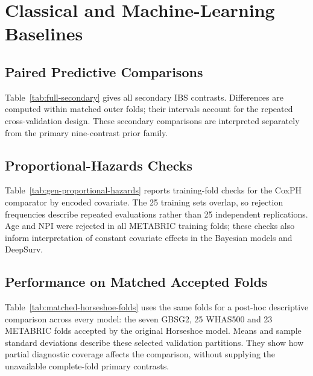 \chapter{Classical and Machine-Learning Baselines}\label{appendix-c-classical-and-machine-learning-baselines}\label{app:baselines}

\section{Paired Predictive Comparisons}
Table~\ref{tab:full-secondary} gives all secondary IBS contrasts. Differences are computed within matched outer folds; their intervals account for the repeated cross-validation design. These secondary comparisons are interpreted separately from the primary nine-contrast prior family.



\section{Proportional-Hazards Checks}
Table~\ref{tab:gen-proportional-hazards} reports training-fold checks for the CoxPH comparator by encoded covariate. The 25 training sets overlap, so rejection frequencies describe repeated evaluations rather than 25 independent replications. Age and NPI were rejected in all METABRIC training folds; these checks also inform interpretation of constant covariate effects in the Bayesian models and DeepSurv.



\section{Performance on Matched Accepted Folds}

Table~\ref{tab:matched-horseshoe-folds} uses the same folds for a post-hoc descriptive comparison across every model: the seven GBSG2, 25 WHAS500 and 23 METABRIC folds accepted by the original Horseshoe model. Means and sample standard deviations describe these selected validation partitions. They show how partial diagnostic coverage affects the comparison, without supplying the unavailable complete-fold primary contrasts.


